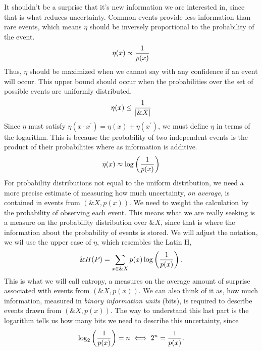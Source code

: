 It shouldn't be a surprise that it's new information we are interested in, since
that is what reduces uncertainty. Common events provide less information than
rare events, which means $\eta$ should be inversely proportional to the
probability of the event.
\begin{align}
  \label{eq:eta-1}
  \eta(x) \propto {1 \over p(x)}
\end{align}
Thus, $\eta$ should be maximized when we cannot say with any confidence if an
event will occur. This upper bound should occur when the probabilities over the
set of possible events are uniformly distributed.
\begin{align}
  \label{eq:eta-2}
  \eta(x) \leq {1 \over |\&X|}
\end{align}
Since $\eta$ must satisfy
$\eta(x \cdot x^\prime) = \eta(x) + \eta(x^\prime)$, we must define
$\eta$ in terms of the logarithm.  This is because the probability of
two independent events is the product of their probabilities where as
information is additive.
\begin{align}
  \label{eq:eta-3}
  \eta(x) \approx \log{\left({1 \over p(x)}\right)}
\end{align}
For probability distributions not equal to the uniform distribution,
we need a more precise estimate of measuring how much uncertainty,
\textit{on average}, is contained in events from $(\&X, p(x))$. We
need to weight the calculation by the probability of observing each
event. This means what we are really seeking is a measure on the
probability distribution over $\&X$, since that is where the
information about the probability of events is stored. We will adjust
the notation, we wil use the upper case of $\eta$, which resembles the
Latin H,
\begin{align}
  \label{eq:eta-almost}
  \&H(P) = \sum_{x \in \&X} p(x) \log\left({1 \over p(x)}\right).
\end{align}
This is what we will call entropy, a measures on the average amount of surprise
associated with events from $(\&X, p(x))$. We can also think of it as, how much
information, measured in \textit{binary information units} (bits), is required
to describe events drawn from $(\&X, p(x))$. The way to understand this last
part is the logarithm tells us how many bits we need to describe this
uncertainty, since
\begin{align}
  \label{eq:understand-log}
  \log_2\left( {1 \over p(x)} \right) = n \iff 2^n = {1 \over p(x)}.
\end{align}
